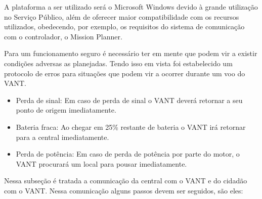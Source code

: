 A plataforma a ser utilizado será o Microsoft Windows devido à grande utilização no Serviço Público, 
além de oferecer maior compatibilidade com os recursos utilizados, obedecendo, por exemplo, os requisitos
do sistema de comunicação com o controlador, o Mission Planner. 

	
Para um funcionamento seguro é necessário ter em mente que podem vir a existir condições adversas as planejadas. Tendo isso em vista foi estabelecido um protocolo de erros para situações que podem vir a ocorrer durante um voo do VANT.

\begin{itemize}
 \item Perda de sinal: Em caso de perda de sinal o VANT deverá retornar a seu ponto de origem imediatamente.
 
 \item Bateria fraca: Ao chegar em 25\% restante de bateria o VANT irá retornar para a central imediatamente.

 \item Perda de potência: Em caso de perda de potência por parte do motor, o VANT procurará um local para pousar imediatamente.

\end{itemize}

Nessa subseção é tratada a comunicação da central com o VANT e do cidadão com o VANT.
Nessa comunicação alguns passos devem ser seguidos, são eles:

